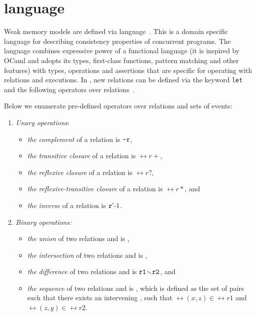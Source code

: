 \section{\cat{} language}
\label{ch:wmm:cat}

Weak memory models are defined via \cat{} language~\cite{alglave2016syntax}.
This is a domain specific language for describing consistency properties of concurrent programs.
The language combines expressive power of a functional language (it is inspired by OCaml and adopts its types, first-class functions, pattern matching and other features) with types, operations and assertions that are specific for operating with relations and executions.
In \cat{}, new relations can be defined via the keyword \texttt{let} and the following operators over relations~\cite{alglave2016syntax}. %


Below we enumerate pre-defined operators over relations and sets of events:

\begin{enumerate}
  \item \textit{Unary operations}:
    \begin{itemize}
      \item \textit{the complement} of a relation  is $\texttt{\textasciitilde r}$,
      \item \textit{the transitive closure} of a relation  is $\rel{r+}$,
      \item \textit{the reflexive closure} of a relation  is $\rel{r?}$,
      \item \textit{the reflexive-transitive closure} of a relation  is $\rel{r*}$, and
      \item \textit{the inverse} of a relation  is $\invrel{r}$.
    \end{itemize}
  \item \textit{Binary operations:}
  \begin{itemize}
    \item \textit{the union} of two relations  and  is ,
    \item \textit{the intersection} of two relations  and  is ,
      \item \textit{the difference} of two relations  and  is $\mathtt{r1 \!\smallsetminus\! r2}$, and
    \item \textit{the sequence} of two relations  and  is , which is defined as the set of pairs  such that there exists an intervening , such that $\rel{(x,z)} \in \rel{r1}$ and $\rel{(z,y)} \in \rel{r2}$.
  \end{itemize}
\end{enumerate}

